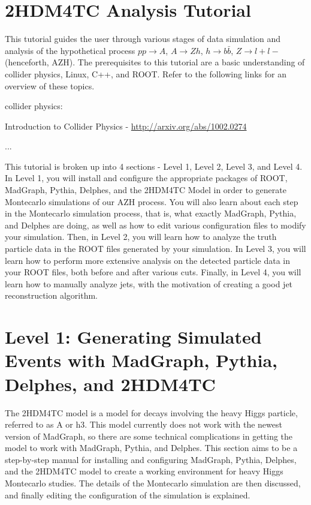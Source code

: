 \documentclass{article}
\begin{document}
\section*{2HDM4TC Analysis Tutorial}

This tutorial guides the user through various stages of data simulation and analysis of the hypothetical process $p p \rightarrow{} A$, $A \rightarrow{} Z h$, $h \rightarrow{} b \bar{b}$, $Z \rightarrow{} l+ l-$ (henceforth, AZH). The prerequisites to this tutorial are a basic understanding of collider physics, Linux, C++, and ROOT. Refer to the following links for an overview of these topics.

\bigskip

collider physics:

Introduction to Collider Physics - \url{http://arxiv.org/abs/1002.0274}

...

\bigskip

This tutorial is broken up into 4 sections - Level 1, Level 2, Level 3, and Level 4. In Level 1, you will install and configure the appropriate packages of ROOT, MadGraph, Pythia, Delphes, and the 2HDM4TC Model in order to generate Montecarlo simulations of our AZH process. You will also learn about each step in the Montecarlo simulation process, that is, what exactly MadGraph, Pythia, and Delphes are doing, as well as how to edit various configuration files to modify your simulation. Then, in Level 2, you will learn how to analyze the truth particle data in the ROOT files generated by your simulation. In Level 3, you will learn how to perform more extensive analysis on the detected particle data in your ROOT files, both before and after various cuts. Finally, in Level 4, you will learn how to manually analyze jets, with the motivation of creating a good jet reconstruction algorithm.

\section{Level 1: Generating Simulated Events with MadGraph, Pythia, Delphes, and 2HDM4TC}

The 2HDM4TC model is a model for decays involving the heavy Higgs particle, referred to as A or h3. This model currently does not work with the newest version of MadGraph, so there are some technical complications in getting the model to work with MadGraph, Pythia, and Delphes. This section aims to be a step-by-step manual for installing and configuring MadGraph, Pythia, Delphes, and the 2HDM4TC model to create a working environment for heavy Higgs Montecarlo studies. The details of the Montecarlo simulation are then discussed, and finally editing the configuration of the simulation is explained.
\end{document}
